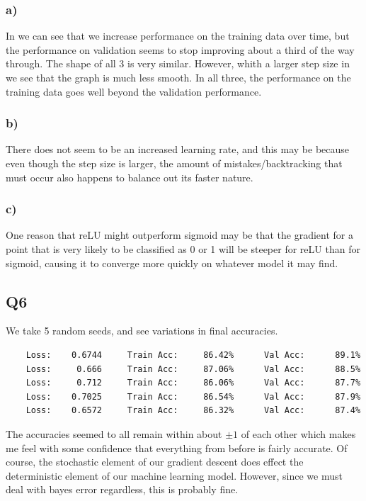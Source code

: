 \documentclass{article}
\theoremstyle{definition}
\begin{document}
        \subsubsection*{a)}
            In  we can see that we increase performance on the training data over time,
            but the performance on validation seems to stop improving about a third of the way through.
            The shape of all 3 is very similar. However, whith a larger step size in  we 
            see that the graph is much less smooth. In all three, the performance on the training data 
            goes well beyond the validation performance.
        \subsubsection*{b)}
            There does not seem to be an increased learning rate, and this may be because even though the 
            step size is larger, the amount of mistakes/backtracking that must occur also happens to balance
            out its faster nature.
        \subsubsection*{c)}
            One reason that reLU might outperform sigmoid may be that the gradient for a point that is very likely 
            to be classified as 0 or 1 will be steeper for reLU than for sigmoid, causing it to converge 
            more quickly on whatever model it may find.
    \subsection*{Q6}
We take 5 random seeds, and see variations in final accuracies.
\begin{verbatim}
    Loss:    0.6744     Train Acc:     86.42%      Val Acc:      89.1%
    Loss:     0.666     Train Acc:     87.06%      Val Acc:      88.5%
    Loss:     0.712     Train Acc:     86.06%      Val Acc:      87.7%
    Loss:    0.7025     Train Acc:     86.54%      Val Acc:      87.9%
    Loss:    0.6572     Train Acc:     86.32%      Val Acc:      87.4%
\end{verbatim}
The accuracies seemed to all remain within about $\pm 1$ of each other 
which makes me feel with some confidence that everything from before is fairly accurate.
Of course, the stochastic element of our gradient descent does effect the 
deterministic element of our machine learning model. However, since we must 
deal with bayes error regardless, this is probably fine.
\end{document}
